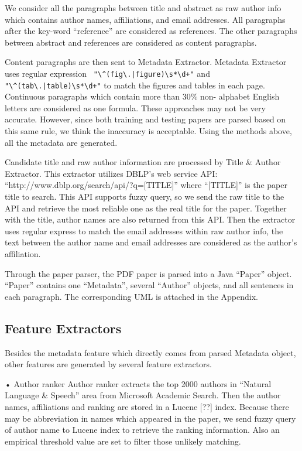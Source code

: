 \documentclass[11pt,letterpaper]{article}
\begin{document}
We consider all the paragraphs between title and abstract as raw author info which contains author names, affiliations, and email addresses. All paragraphs after the key-word “reference” are considered as references. The other paragraphs between abstract and references are considered as content paragraphs. 

Content paragraphs are then sent to Metadata Extractor. 
Metadata Extractor uses regular expression \verb- "\^(fig\.|figure)\s*\d+"- and  \verb-"\^(tab\.|table)\s*\d+"- to match the figures and tables in each page. Continuous paragraphs which contain more than 30\% non- alphabet English letters are considered as one formula. These approaches may not be very accurate. However, since both training and testing papers are parsed based on this same rule, we think the inaccuracy is acceptable. Using the methods above, all the metadata are generated. 

Candidate title and raw author information are processed by Title \& Author Extractor. This extractor utilizes DBLP’s web service API: 
“http://www.dblp.org/search/api/?q=[TITLE]”  
where “[TITLE]” is the paper title to search. This API supports fuzzy query, so we send the raw title to the API and retrieve the most reliable one as the real title for the paper. Together with the title, author names are also returned from this API. Then the extractor uses regular express to match the email addresses within raw author info, the text between the author name and email addresses are considered as the author’s affiliation. 

Through the paper parser, the PDF paper is parsed into a Java “Paper” object. “Paper” contains one “Metadata”, several “Author” objects, and all sentences in each paragraph. The corresponding UML is attached in the Appendix. 


\subsection{Feature Extractors}
Besides the metadata feature which directly comes from parsed Metadata object, other features are generated by several feature extractors. 

•	Author ranker
Author ranker extracts the top 2000 authors in “Natural Language \& Speech” area from Microsoft Academic Search. Then the author names, affiliations and ranking are stored in a Lucene [??] index. Because there may be abbreviation in names which appeared in the paper, we send fuzzy query of author name to Lucene index to retrieve the ranking information. Also an empirical threshold value are set to filter those unlikely matching. 
\end{document}
